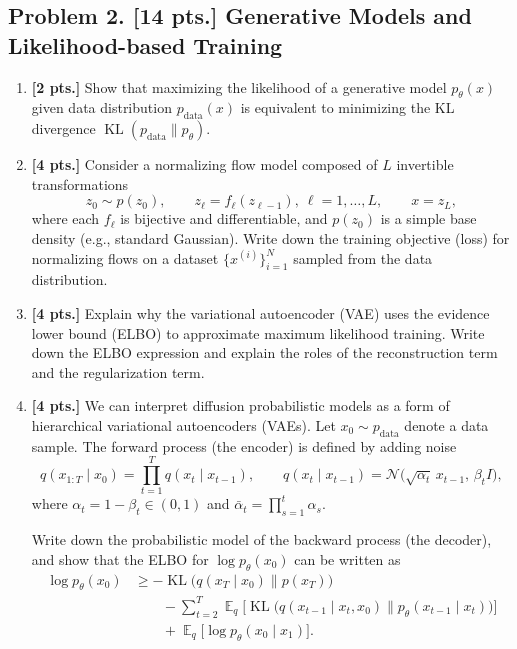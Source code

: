 \documentclass[11pt,a4paper]{article}
\DeclareMathOperator{\E}{\mathbb{E}}
\DeclareMathOperator{\KL}{KL}
\begin{document}
\subsection{Problem 2. [14 pts.] Generative Models and Likelihood-based Training}
\begin{enumerate}[label=(\alph*)]
    \item \textbf{[2 pts.]} Show that maximizing the likelihood of a generative model $p_{\theta}(x)$ given data distribution $p_{\mathrm{data}}(x)$ is equivalent to minimizing the KL divergence $\KL(p_{\mathrm{data}} \parallel p_{\theta})$.
    \item \textbf{[4 pts.]} Consider a normalizing flow model composed of $L$ invertible transformations
    \[
    z_0 \sim p(z_0), \qquad z_{\ell} = f_{\ell}(z_{\ell-1}),\ \ell = 1, \dots, L, \qquad x = z_L,
    \]
    where each $f_{\ell}$ is bijective and differentiable, and $p(z_0)$ is a simple base density (e.g., standard Gaussian). Write down the training objective (loss) for normalizing flows on a dataset $\{x^{(i)}\}_{i=1}^{N}$ sampled from the data distribution.
    \item \textbf{[4 pts.]} Explain why the variational autoencoder (VAE) uses the evidence lower bound (ELBO) to approximate maximum likelihood training. Write down the ELBO expression and explain the roles of the reconstruction term and the regularization term.
    \item \textbf{[4 pts.]} We can interpret diffusion probabilistic models as a form of hierarchical variational autoencoders (VAEs). Let $x_0 \sim p_{\mathrm{data}}$ denote a data sample. The forward process (the encoder) is defined by adding noise
    \[
    q(x_{1:T} \mid x_0) = \prod_{t=1}^{T} q(x_t \mid x_{t-1}), \qquad q(x_t \mid x_{t-1}) = \mathcal{N}\bigl(\sqrt{\alpha_t}\, x_{t-1},\, \beta_t I\bigr),
    \]
    where $\alpha_t = 1 - \beta_t \in (0, 1)$ and $\bar{\alpha}_t = \prod_{s=1}^{t} \alpha_s$.

    Write down the probabilistic model of the backward process (the decoder), and show that the ELBO for $\log p_{\theta}(x_0)$ can be written as
    \begin{align*}
    \log p_{\theta}(x_0)
    &\ge -\KL\bigl(q(x_T \mid x_0) \parallel p(x_T)\bigr) \\
    &\qquad - \sum_{t=2}^{T} \E_q \bigl[ \KL\bigl(q(x_{t-1} \mid x_t, x_0) \parallel p_{\theta}(x_{t-1} \mid x_t)\bigr) \bigr] \\
    &\qquad + \E_q \bigl[ \log p_{\theta}(x_0 \mid x_1) \bigr].
    \end{align*}
\end{enumerate}
\end{document}
